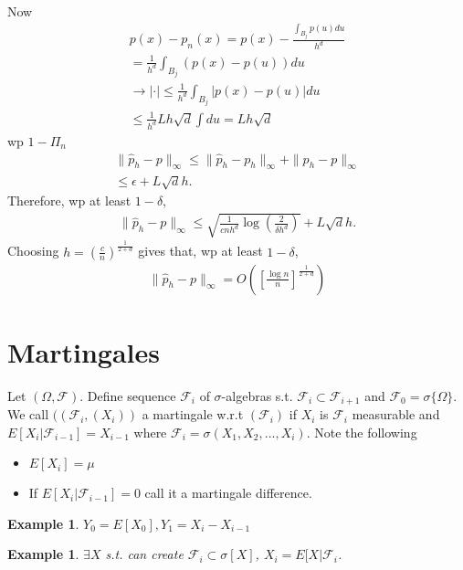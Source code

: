 \documentclass[10pt]{article}
\newtheorem{example}[ex]{Example}
\renewcommand{\hat}{\widehat}
\begin{document}
Now 
\begin{align*}
p(x) - p_{n}(x) = p(x) - \frac{\int_{B_{j}}p(u)du } {h^{d}} \\
                     = \frac{1}{h^{d}}\int_{B_{j}}(p(x) - p(u))du \\
\rightarrow |\cdot | \le \frac{1}{h^{d}}\int_{B_{j}}|p(x)-p(u)|du \\
\le \frac{1}{h^{d}}Lh\sqrt{d}\int du = Lh\sqrt{d}
\end{align*}
wp $1- \Pi_{n}$
\begin{align*}
\|\hat{p}_{h} - p \|_{\infty} \le \|\hat{p}_{h} - p_{h}\|_{\infty} + \| p_{h} - p \|_{\infty}\\ \le \epsilon + L\sqrt{d} h.
\end{align*}
Therefore, wp at least $1- \delta$,
\begin{align*}
\|\hat{p}_{h} - p\|_{\infty} \le \sqrt{\frac{1}{cnh^{d}}\log\left(\frac{2}{\delta h^{d}}\right)} + L\sqrt{d} h.
\end{align*}
Choosing $h = (\frac{c}{n})^{\frac{1}{2+d}}$
gives that,
wp at least $1 - \delta$,
\begin{align*}
\|\hat{p}_{h} - p \|_{\infty} = O\left(\left[\frac{\log n}{n}\right]^{\frac{1}{2+d}}\right)
\end{align*}

\section{Martingales}
Let $(\Omega, \mathscr{F})$. Define sequence $\mathscr{F}_{i}$ of $\sigma$-algebras s.t. $\mathscr{F}_{i} \subset \mathscr{F}_{i+1}$ and $\mathscr{F}_{0} = \sigma\{ \Omega\}$. We call $((\mathscr{F}_{i}, (X_{i}))$ a martingale w.r.t $(\mathscr{F}_{i})$ if $X_{i}$ is $\mathscr{F}_{i}$ measurable and $E[X_{i} | \mathscr{F}_{i-1}] = X_{i-1}$ where $\mathscr{F}_{i} = \sigma(X_{1},X_{2},...,X_{i})$. Note the following 
\begin{itemize}
\item $ E[X_{i}] = \mu $
\item If $E[X_{i}|\mathscr{F}_{i-1}] = 0$ call it a martingale difference.
\end{itemize}

\begin{example}
$Y_{0} = E[X_{0}], Y_{1} = X_{i} - X_{i-1}$
\end{example}
\begin{example}
$\exists X$ s.t. can create $\mathscr{F}_{i} \subset \sigma[X]$, $X_{i} = E[X | \mathscr{F}_{i}$.
\end{example}
\end{document}
